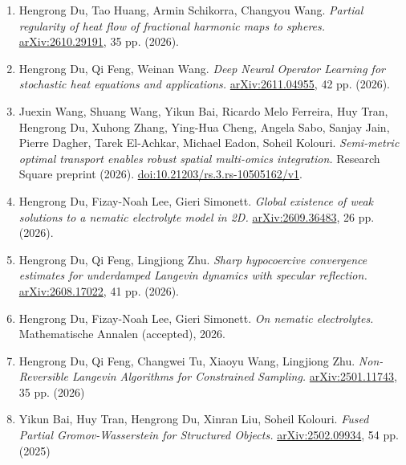 \documentclass[12pt]{article}
\makeatletter
\newlength{\bibhang}
\newlength{\bibsep}
 {\@listi \global\bibsep\itemsep \global\advance\bibsep by\parsep}
\newenvironment{bibsection}%
        {\begin{enumerate}{}{%
       \setlength{\leftmargin}{\bibhang}%
       \setlength{\itemindent}{-\leftmargin}%
       \setlength{\itemsep}{\bibsep}%
       \setlength{\parsep}{\z@}%
        \setlength{\partopsep}{0pt}%
        \setlength{\topsep}{0pt}}}
        {\end{enumerate}\vspace{-.6\baselineskip}}
\makeatother
\begin{document}
\begin{bibsection}
\item Hengrong Du, Tao Huang, Armin Schikorra, Changyou Wang. \emph{Partial regularity of heat flow of fractional harmonic maps to spheres.} \href{https://arxiv.org/abs/2610.29191}{arXiv:2610.29191}, 35 pp. (2026).

\item Hengrong Du, Qi Feng, Weinan Wang. \emph{Deep Neural Operator Learning for stochastic heat equations and applications.} \href{https://arxiv.org/abs/2611.04955}{arXiv:2611.04955}, 42 pp. (2026).

\item Juexin Wang, Shuang Wang, Yikun Bai, Ricardo Melo Ferreira, Huy Tran, Hengrong Du, Xuhong Zhang, Ying-Hua Cheng, Angela Sabo, Sanjay Jain, Pierre Dagher, Tarek El-Achkar, Michael Eadon, Soheil Kolouri. \emph{Semi-metric optimal transport enables robust spatial multi-omics integration.} Research Square preprint (2026). \href{https://doi.org/10.21203/rs.3.rs-10505162/v1}{doi:10.21203/rs.3.rs-10505162/v1}.

\item Hengrong Du, Fizay-Noah Lee, Gieri Simonett. \emph{Global existence of weak solutions to a nematic electrolyte model in 2D.} \href{https://arxiv.org/abs/2609.36483}{arXiv:2609.36483}, 26 pp. (2026).

\item Hengrong Du, Qi Feng, Lingjiong Zhu. \emph{Sharp hypocoercive convergence estimates for underdamped Langevin dynamics with specular reflection.} \href{https://arxiv.org/abs/2608.17022}{arXiv:2608.17022}, 41 pp. (2026).

\item Hengrong Du, Fizay-Noah Lee, Gieri Simonett. \emph{On nematic electrolytes.} Mathematische Annalen (accepted), 2026.

\item Hengrong Du, Qi Feng, Changwei Tu, Xiaoyu Wang, Lingjiong Zhu.
\emph{Non-Reversible Langevin Algorithms for Constrained Sampling.}
\href{https://arxiv.org/abs/2501.11743}{arXiv:2501.11743}, 35 pp. (2026)

\item Yikun Bai, Huy Tran, Hengrong Du, Xinran Liu, Soheil Kolouri. \emph{Fused Partial Gromov-Wasserstein for Structured Objects.}
\href{https://arxiv.org/abs/2502.09934}{arXiv:2502.09934}, 54 pp. (2025)









\end{bibsection}
\end{document}
